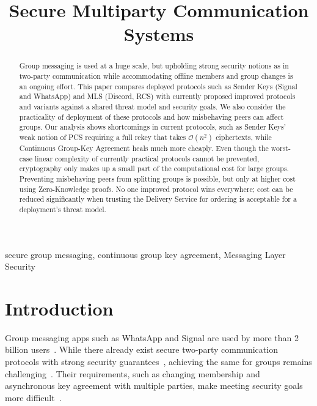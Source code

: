 \documentclass[conference]{IEEEtran}
\begin{document}
\title{Secure Multiparty Communication Systems}

\author{
}

\maketitle

\begin{abstract}
Group messaging is used at a huge scale, but upholding strong security notions as in two-party communication while accommodating offline members and group changes is an ongoing effort.
This paper compares deployed protocols such as Sender Keys (Signal and WhatsApp) and MLS (Discord, RCS) with currently proposed improved protocols and variants against a shared threat model and security goals.
We also consider the practicality of deployment of these protocols and how misbehaving peers can affect groups.
Our analysis shows shortcomings in current protocols, such as Sender Keys' weak notion of PCS requiring a full rekey that takes $\mathcal{O}(n^2)$ ciphertexts, while Continuous Group-Key Agreement heals much more cheaply.
Even though the worst-case linear complexity of currently practical protocols cannot be prevented, cryptography only makes up a small part of the computational cost for large groups.
Preventing misbehaving peers from splitting groups is possible, but only at higher cost using Zero-Knowledge proofs.
No one improved protocol wins everywhere; cost can be reduced significantly when trusting the Delivery Service for ordering is acceptable for a deployment's threat model.
\end{abstract}

\begin{IEEEkeywords}
secure group messaging,
continuous group key agreement,
Messaging Layer Security
\end{IEEEkeywords}

\section{Introduction}
Group messaging apps such as WhatsApp and Signal are used by more than 2 billion users~\cite{alwenContinuousGroupKey2020}.
While there already exist secure two-party communication protocols with strong security guarantees~\cite{perrinDoubleRatchetAlgorithm,kretPQXDHKeyAgreement}, achieving the same for groups remains challenging~\cite{barnesMessagingLayerSecurity2023}.
Their requirements, such as changing membership and asynchronous key agreement with multiple parties, make meeting security goals more difficult~\cite{barnesMessagingLayerSecurity2023}.
\end{document}
